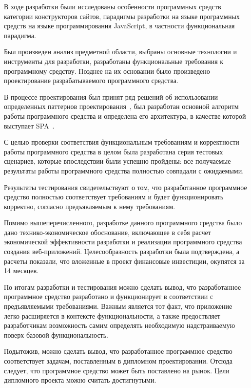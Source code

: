 
В ходе разработки были исследованы особенности программных средств категории конструкторов сайтов, парадигмы разработки на языке программных средств на языке программирования JavaScript, в частности функциональная парадигма.

Был произведен анализ предметной области, выбраны основные технологии и инструменты для разработки, разработаны функциональные требования к программному средству. Позднее на их основании было произведено проектирование разрабатываемого программного средства.

В процессе проектирования был принят ряд решений об использовании определенных паттернов проектирования~\cite{wiki_design_patterns}, был разработан основной алгоритм работы программного средства и определена его архитектура, в качестве которой выступает SPA~\cite{wiki_spa}.

С целью проверки соответствия функциональным требованиям и корректности работы программного средства в целом была разработана серия тестовых сценариев, которые впоследствии были успешно пройдены: все получаемые результаты работы программного средства полностью совпадали с ожидаемыми.

Результаты тестирования свидетельствуют о том, что разработанное программное средство полностью соответствует требованиям и будет функционировать корректно, согласно предъявляемым к нему требованиям.

Помимо вышеперечисленного, разработке данного программного средства было дано технико-экономическое обоснование, включающее в себя расчет экономической эффективности разработки и реализации программного средства создания веб-приложений. Целесообразность разработки была подтверждена, а расчеты показали, что вложенные в проект финансовые инвестиции, окупятся за 14 месяцев.

По итогам разработки и тестирования можно сделать вывод, что разработанное программное средство разработано и функционирует в соответствии с предъявляемыми требованиями. Важным является тот факт, что приложение легко расширяется в контексте функциональности, а также предоствляет разработчикам возможность самим определять необходимую надстраиваемую поверх базовой функциональность.

Подытожив, можно сделать вывод, что разработанное программное средство соответствует задачам, поставленным в дипломном проектировании. Отсюда следует, что программное средство может быть поставлено на рынок. Цели дипломного проекта можно считать достигнутыми.
